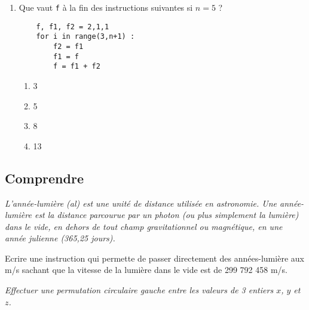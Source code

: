 \begin{td}[QCM (2)]
\begin{enumerate}
	\begin{py}{4cm}
	\begin{verbatim}
	f = 1
	for i in range(2,n+1) :
	    f = f * i
	\end{verbatim}
	\end{py}

	\begin{enumerate}
	\item 120
	\item 720
	\item 6
	\item 24
	\end{enumerate}
\item Que vaut {\tt f} à la fin des instructions suivantes si $n = 5$ ?

	\begin{py}{4cm}
	\begin{verbatim}
	f, f1, f2 = 2,1,1
	for i in range(3,n+1) :
	    f2 = f1
	    f1 = f
	    f = f1 + f2
	\end{verbatim}
	\end{py}

	\begin{enumerate}
	\item 3
	\item 5
	\item 8
	\item 13
	\end{enumerate}
\end{enumerate}
\end{td}


\subsection{Comprendre}
\begin{td}\label{td:al}\em {}
L'année-lumière (al) est une unité de distance utilisée en astronomie. 
Une année-lumière est la distance parcourue par un photon (ou plus simplement la lumière) 
dans le vide, en dehors de tout champ gravitationnel ou magnétique, en une année julienne 
(365,25 jours). 

Ecrire une instruction qui permette de passer directement des années-lumière aux m/s sachant que
la vitesse de la lumière dans le vide est de 299 792 458 m/s.
\end{td}

\begin{td}\label{td:permutation2}\em {}
 Effectuer une permutation circulaire gauche entre les valeurs de 3 entiers $x$, $y$ et $z$.
\end{td}

